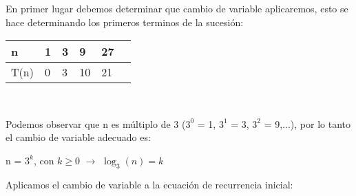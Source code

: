 \begin{solution}
En primer lugar debemos determinar que cambio de variable aplicaremos, esto se hace determinando los primeros terminos de la sucesión:
  \begin{center}
    \begin{tabular}{@{}llllll@{}}
        \toprule
        n & 1 & 3 & 9 & 27 \\ \midrule
        T(n) & 0 & 3 & 10 & 21 \\ 
        \bottomrule
    \end{tabular}\\
  \end{center}
  
  Podemos observar que n es múltiplo de 3 ($3^0$ = 1, $3^1$ = 3, $3^2$ = 9,...), por lo tanto el cambio de variable adecuado es:
  \begin{center}
      n = $3^k$, con $k \ge 0$ $\xrightarrow{}$ $\log_3 (n) = k$
  \end{center}
  
  Aplicamos el cambio de variable a la ecuación de recurrencia inicial:
  

\end{solution}
